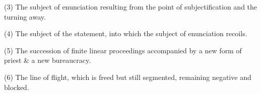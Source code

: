 \documentclass{scrartcl}
\begin{document}
	{\small\hspace{-1.4cm}(3) The subject of enunciation resulting from the point of subjectification and the turning away.}
	
	{\small\hspace{-1.4cm}(4) The subject of the statement, into which the subject of enunciation recoils.}
	
	{\small\hspace{-1.4cm}(5) \hspace{0.03cm}The succession of finite linear proceedings accompanied by a new form of priest \& a new bureaucracy.}
	
	{\small\hspace{-1.4cm}(6) The line of flight, which is freed but still segmented, remaining negative and blocked.}
	
	
	\vspace{1.5cm}
	
\end{document}
